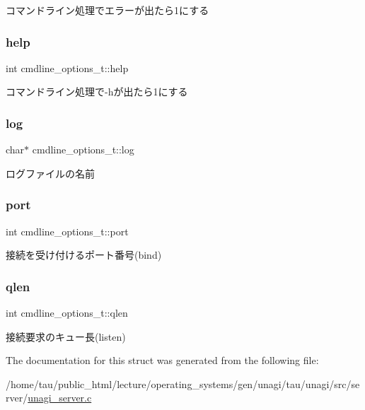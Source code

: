 コマンドライン処理でエラーが出たら1にする \mbox{\label{structcmdline__options__t_ab02741e43bb19900e87caaec3a8dd794}} 
\subsubsection{\texorpdfstring{help}{help}}
{\footnotesize\ttfamily int cmdline\+\_\+options\+\_\+t\+::help}

コマンドライン処理で\textquotesingle{}-\/h\textquotesingle{}が出たら1にする \mbox{\label{structcmdline__options__t_acaaaf78bacddf9ff0779a4956978fd06}} 
\subsubsection{\texorpdfstring{log}{log}}
{\footnotesize\ttfamily char$\ast$ cmdline\+\_\+options\+\_\+t\+::log}

ログファイルの名前 \mbox{\label{structcmdline__options__t_af2128a9d51a25bcf0c62e6c380f40d5b}} 
\subsubsection{\texorpdfstring{port}{port}}
{\footnotesize\ttfamily int cmdline\+\_\+options\+\_\+t\+::port}

接続を受け付けるポート番号(bind) \mbox{\label{structcmdline__options__t_abfb9636e391795e6859dea0419dc199f}} 
\subsubsection{\texorpdfstring{qlen}{qlen}}
{\footnotesize\ttfamily int cmdline\+\_\+options\+\_\+t\+::qlen}

接続要求のキュー長(listen) 

The documentation for this struct was generated from the following file\+:\begin{DoxyCompactItemize}
\item 
/home/tau/public\+\_\+html/lecture/operating\+\_\+systems/gen/unagi/tau/unagi/src/server/\hyperlink{unagi__server_8c}{unagi\+\_\+server.\+c}\end{DoxyCompactItemize}

